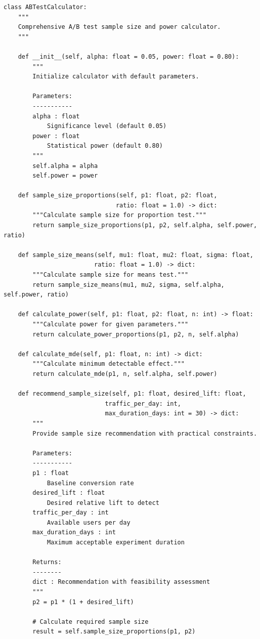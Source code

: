 \begin{lstlisting}
class ABTestCalculator:
    """
    Comprehensive A/B test sample size and power calculator.
    """

    def __init__(self, alpha: float = 0.05, power: float = 0.80):
        """
        Initialize calculator with default parameters.

        Parameters:
        -----------
        alpha : float
            Significance level (default 0.05)
        power : float
            Statistical power (default 0.80)
        """
        self.alpha = alpha
        self.power = power

    def sample_size_proportions(self, p1: float, p2: float,
                               ratio: float = 1.0) -> dict:
        """Calculate sample size for proportion test."""
        return sample_size_proportions(p1, p2, self.alpha, self.power, ratio)

    def sample_size_means(self, mu1: float, mu2: float, sigma: float,
                         ratio: float = 1.0) -> dict:
        """Calculate sample size for means test."""
        return sample_size_means(mu1, mu2, sigma, self.alpha, self.power, ratio)

    def calculate_power(self, p1: float, p2: float, n: int) -> float:
        """Calculate power for given parameters."""
        return calculate_power_proportions(p1, p2, n, self.alpha)

    def calculate_mde(self, p1: float, n: int) -> dict:
        """Calculate minimum detectable effect."""
        return calculate_mde(p1, n, self.alpha, self.power)

    def recommend_sample_size(self, p1: float, desired_lift: float,
                            traffic_per_day: int,
                            max_duration_days: int = 30) -> dict:
        """
        Provide sample size recommendation with practical constraints.

        Parameters:
        -----------
        p1 : float
            Baseline conversion rate
        desired_lift : float
            Desired relative lift to detect
        traffic_per_day : int
            Available users per day
        max_duration_days : int
            Maximum acceptable experiment duration

        Returns:
        --------
        dict : Recommendation with feasibility assessment
        """
        p2 = p1 * (1 + desired_lift)

        # Calculate required sample size
        result = self.sample_size_proportions(p1, p2)


\end{lstlisting}
